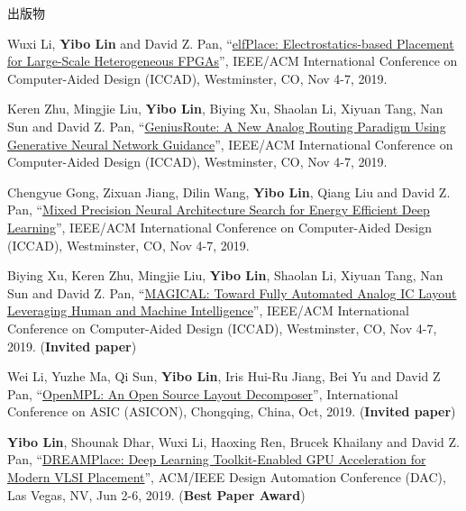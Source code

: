 \begin{rSection}{出版物}
\begin{description}[font=\normalfont]
{}
            

\item[{[C33]}]{
        Wuxi Li, \textbf{Yibo Lin} and David Z. Pan, 
    ``\href{https://doi.org/10.1109/ICCAD45719.2019.8942075}{elfPlace: Electrostatics-based Placement for Large-Scale Heterogeneous FPGAs}'', 
    IEEE/ACM International Conference on Computer-Aided Design (ICCAD), Westminster, CO, Nov 4-7, 2019.
    
}
            

\item[{[C32]}]{
        Keren Zhu, Mingjie Liu, \textbf{Yibo Lin}, Biying Xu, Shaolan Li, Xiyuan Tang, Nan Sun and David Z. Pan, 
    ``\href{https://doi.org/10.1109/ICCAD45719.2019.8942164}{GeniusRoute: A New Analog Routing Paradigm Using Generative Neural Network Guidance}'', 
    IEEE/ACM International Conference on Computer-Aided Design (ICCAD), Westminster, CO, Nov 4-7, 2019.
    
}
            

\item[{[C31]}]{
        Chengyue Gong, Zixuan Jiang, Dilin Wang, \textbf{Yibo Lin}, Qiang Liu and David Z. Pan, 
    ``\href{https://doi.org/10.1109/ICCAD45719.2019.8942147}{Mixed Precision Neural Architecture Search for Energy Efficient Deep Learning}'', 
    IEEE/ACM International Conference on Computer-Aided Design (ICCAD), Westminster, CO, Nov 4-7, 2019.
    
}
            

\item[{[C30]}]{
        Biying Xu, Keren Zhu, Mingjie Liu, \textbf{Yibo Lin}, Shaolan Li, Xiyuan Tang, Nan Sun and David Z. Pan, 
    ``\href{https://doi.org/10.1109/ICCAD45719.2019.8942060}{MAGICAL: Toward Fully Automated Analog IC Layout Leveraging Human and Machine Intelligence}'', 
    IEEE/ACM International Conference on Computer-Aided Design (ICCAD), Westminster, CO, Nov 4-7, 2019.
    (\textbf{Invited paper})
}
            

\item[{[C29]}]{
        Wei Li, Yuzhe Ma, Qi Sun, \textbf{Yibo Lin}, Iris Hui-Ru Jiang, Bei Yu and David Z Pan, 
    ``\href{https://arxiv.org/abs/1809.07554}{OpenMPL: An Open Source Layout Decomposer}'', 
    International Conference on ASIC (ASICON), Chongqing, China, Oct, 2019.
    (\textbf{Invited paper})
}
            

\item[{[C28]}]{
        \textbf{Yibo Lin}, Shounak Dhar, Wuxi Li, Haoxing Ren, Brucek Khailany and David Z. Pan, 
    ``\href{https://doi.org/10.1145/3316781.3317803}{DREAMPlace: Deep Learning Toolkit-Enabled GPU Acceleration for Modern VLSI Placement}'', 
    ACM/IEEE Design Automation Conference (DAC), Las Vegas, NV, Jun 2-6, 2019.
    (\textbf{Best Paper Award})
}
            


\end{description}
\end{rSection}
